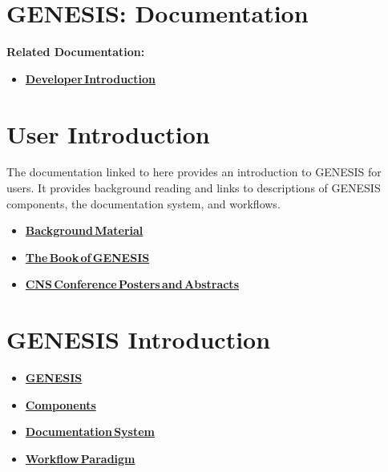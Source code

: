 \documentclass[12pt]{article}
\begin{document}
\section*{GENESIS: Documentation}

{\bf Related Documentation:}
\begin{itemize}
   \item[]\href{../developer-intro/developer-intro.tex}{\bf Developer\,Introduction}
\end{itemize}

\section*{User Introduction}

The documentation linked to here provides an introduction to GENESIS for users. It provides background reading and links to descriptions of GENESIS components, the documentation system, and workflows.
\begin{itemize}
   \item[]\href{../background-material/background-material.tex}{\bf Background\,Material}
   \item[]\href{../book-of-genesis/book-of-genesis.tex}{\bf The\,Book\,of\,GENESIS}
   \item[]\href{../cns/cns.tex}{\bf CNS\,Conference\,Posters\,and\,Abstracts}
\end{itemize}

\section*{GENESIS Introduction}
\begin{itemize}
   \item[]\href{../genesis-intro/genesis-intro.tex}{\bf GENESIS}
   \item[]\href{../genesis-components/genesis-components.tex}{\bf Components}
   \item[]\href{../documentation-overview/documentation-overview.tex}{\bf Documentation\,System}
   \item[]\href{../workflow-intro/workflow-intro.tex}{\bf Workflow\,Paradigm}
\end{itemize}
\end{document}
